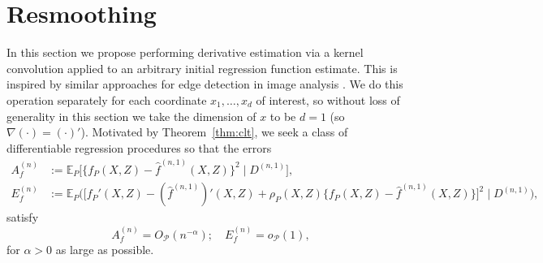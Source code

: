 \documentclass[aos]{imsart}
\newcommand{\E}{\mathbb{E}}
\newcommand{\given}{\,|\,}
\begin{document}
	
	
	
	
	
	
	
	\section{Resmoothing}
	\label{sect:resmooth}
	
	
	In this section we propose performing derivative estimation via a kernel convolution applied to an arbitrary initial regression function estimate. This is inspired by similar approaches for edge detection in image analysis \citep{CannyEdge}. We do this operation separately for each coordinate $x_1,\ldots,x_d$ of interest, so without loss of generality in this section we take the dimension of $x$ to be $d=1$ (so $\nabla(\cdot) = (\cdot)'$). Motivated by Theorem~\ref{thm:clt}, we seek a class of differentiable regression procedures so that the errors
	\begin{align*}
		A_f^{(n)} &:= \E_P \big[\{f_P(X,Z)-\hat f^{(n,1)}(X,Z)\}^2 \; \big| \; D^{(n,1)}\big],\\
		E_f^{(n)} &:= \E_P\Big(\big[ f_P'(X,Z)-(\hat{f}^{(n,1)})'(X,Z) +\rho_{P}(X,Z)\{f_P(X,Z)-\hat f^{(n,1)}(X,Z)\}\big]^2 \; \Big| \; D^{(n,1)}\Big),
	\end{align*}
	satisfy \begin{equation*}
		A_f^{(n)} = O_{\mathcal{P}}(n^{-\alpha});\quad
		E_f^{(n)}=o_{\mathcal{P}}(1),
	\end{equation*}
	for $\alpha>0$ as large as possible.
	
\end{document}
